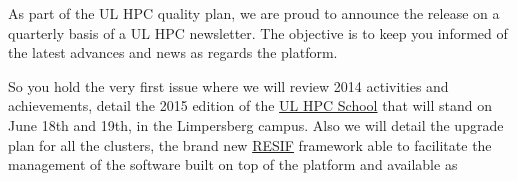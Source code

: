 \documentclass{article}
\begin{document}
\ulhpctoc

\begin{welcome}
  As part of the UL HPC quality plan, we are proud to announce the release on a quarterly basis of a UL HPC newsletter. 
  The objective is to keep you informed of the latest advances and news as regards the \ulhpc platform.

  So you hold the very first issue where we will review 2014 activities and achievements, detail the 2015 edition of the \href{https://hpc.uni.lu/hpc-school/}{UL HPC School} that will stand on June 18th and 19th, in the Limpersberg campus. 
  Also we will detail the upgrade plan for all the clusters, the brand new \href{}{RESIF} framework able to facilitate the management of the software built on top of the platform and available as 

   







\end{welcome}
\end{document}
